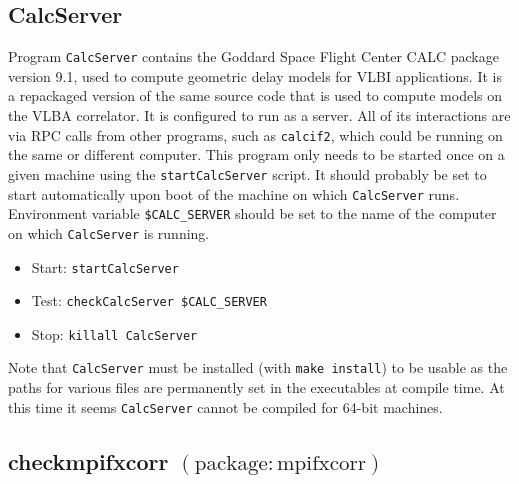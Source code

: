 







\subsection{CalcServer} \label{sec:CalcServer}

Program {\tt CalcServer} contains the Goddard Space Flight Center CALC package version 9.1, used to compute geometric delay models for VLBI applications.
It is a repackaged version of the same source code that is used to compute models on the VLBA correlator.
It is configured to run as a server.
All of its interactions are via RPC calls from other programs, such as {\tt calcif2}, which could be running on the same or different computer.
\newcommand{\oa}[1]{\hspace{-12pt}\makebox[12pt]{$\star$}#1}
This program only needs to be started once on a given machine using the {\tt startCalcServer} script.
It should probably be set to start automatically upon boot of the machine on which {\tt CalcServer} runs.
Environment variable {\tt \$CALC\_SERVER} should be set to the name of the computer on which {\tt CalcServer} is running.

\begin{itemize}
\item[] Start: {\tt startCalcServer}
\item[] Test: {\tt checkCalcServer \$CALC\_SERVER}
\item[] Stop: {\tt killall CalcServer}
\end{itemize}

\noindent
Note that {\tt CalcServer} must be installed (with {\tt make install}) to be usable as the paths for various files are permanently set in the executables at compile time.
At this time it seems {\tt CalcServer} cannot be compiled for 64-bit machines.








\subsection{checkmpifxcorr {\small $\mathrm{(package: mpifxcorr)}$}}

